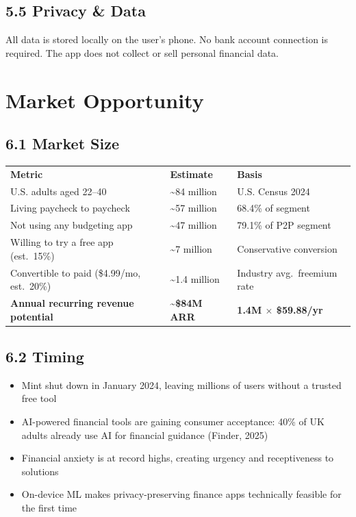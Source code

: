 \documentclass[11pt,a4paper]{article}
\begin{document}
\subsection{5.5 Privacy \& Data}

All data is stored locally on the user's phone. No bank account connection is required.
The app does not collect or sell personal financial data.

\newpage

\section{Market Opportunity}

\subsection{6.1 Market Size}

\vspace{0.5em}
\begin{tabularx}{\textwidth}{L{6.5cm} L{3cm} L{5.5cm}}
\color{white}\textbf{Metric} & \color{white}\textbf{Estimate} & \color{white}\textbf{Basis} \\
U.S. adults aged 22--40 & \textasciitilde84 million & U.S. Census 2024 \\
Living paycheck to paycheck & \textasciitilde57 million & 68.4\% of segment \\
Not using any budgeting app & \textasciitilde47 million & 79.1\% of P2P segment \\
Willing to try a free app (est.\ 15\%) & \textasciitilde7 million & Conservative conversion \\
Convertible to paid (\$4.99/mo, est.\ 20\%) & \textasciitilde1.4 million & Industry avg.\ freemium rate \\
\textbf{Annual recurring revenue potential} & \textbf{\textasciitilde\$84M ARR} & \textbf{1.4M $\times$ \$59.88/yr} \\
\end{tabularx}
\vspace{0.5em}

\subsection{6.2 Timing}

\begin{itemize}
  \item Mint shut down in January 2024, leaving millions of users without a trusted free tool
  \item AI-powered financial tools are gaining consumer acceptance: 40\% of UK adults already
        use AI for financial guidance (Finder, 2025)
  \item Financial anxiety is at record highs, creating urgency and receptiveness to solutions
  \item On-device ML makes privacy-preserving finance apps technically feasible for the first time
\end{itemize}
\end{document}
